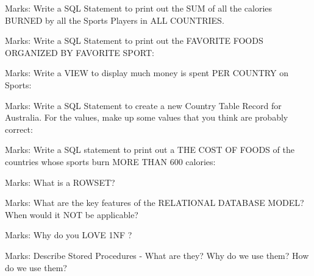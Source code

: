 \begin{questions}

 Marks: Write a SQL Statement to print out the SUM of all the 
calories BURNED by all the Sports Players in ALL COUNTRIES.
\vspace{4cm}

 Marks: Write a SQL Statement to print out the FAVORITE FOODS ORGANIZED BY FAVORITE SPORT:
\vspace{4cm}

 Marks: Write a VIEW to display much money is spent PER COUNTRY on Sports:
\vspace{4cm}

 Marks: Write a SQL Statement to create a new Country Table Record for Australia. For the values, make up some values that you think are probably correct:
\vspace{4cm}

 Marks: Write a SQL statement to print out a THE COST OF FOODS of the countries whose sports burn MORE THAN 600 calories:
\vspace{4cm}


 Marks: What is a ROWSET?
\vspace{4cm}

 Marks: What are the key features of the RELATIONAL DATABASE MODEL? When would it NOT be applicable?
\vspace{5cm}

 Marks: Why do you LOVE 1NF ?
\vspace{4cm}


 Marks: Describe Stored Procedures - What are they? Why do we use them? How do we use them?
\vspace{3cm}



\end{questions}


